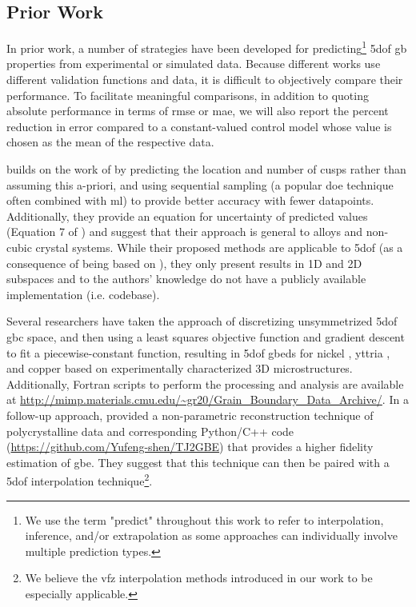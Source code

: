 \documentclass[final,twocolumn,12pt]{elsarticle}
\begin{document}
\subsection{Prior Work}
\label{sec:intro:prior}
 In prior work, a number of strategies have been developed for predicting\footnote{We use the term "predict" throughout this work to refer to interpolation, inference, and/or extrapolation as some approaches can individually involve multiple prediction types. } \gls{5dof} \gls{gb} properties from experimental or simulated data. Because different works use different validation functions and data, it is difficult to objectively compare their performance. To facilitate meaningful comparisons, in addition to quoting absolute performance in terms of \gls{rmse} or \gls{mae}, we will also report the percent reduction in error compared to a constant-valued control model whose value is chosen as the mean of the respective \inpt{} data.

\citet{detteEfficientSamplingMaterials2017} builds on the work of \citet{bulatovGrainBoundaryEnergy2014} by predicting the location and number of cusps rather than assuming this a-priori, and using sequential sampling (a popular \gls{doe} technique often combined with \gls{ml}) to provide better accuracy with fewer datapoints. Additionally, they provide an equation for uncertainty of predicted values (Equation 7 of \cite{detteEfficientSamplingMaterials2017}) and suggest that their approach is general to alloys and non-cubic crystal systems. While their proposed methods are applicable to \gls{5dof} (as a consequence of being based on \citet{bulatovGrainBoundaryEnergy2014}), they only present results in 1D and 2D subspaces and to the authors' knowledge do not have a publicly available implementation (i.e. codebase).

Several researchers have taken the approach of discretizing unsymmetrized \gls{5dof} \gls{gbc} space, and then using a least squares objective function and gradient descent to fit a piecewise-constant function, resulting in \gls{5dof} \glspl{gbed} for nickel \cite{liRelativeGrainBoundary2009}, yttria \cite{dillonCharacterizationGrainboundaryCharacter2009}, and copper \cite{randleFiveparameterGrainBoundary2008} based on experimentally characterized 3D microstructures. Additionally, Fortran scripts to perform the processing and analysis are available at \url{http://mimp.materials.cmu.edu/~gr20/Grain_Boundary_Data_Archive/}. In a follow-up approach, \citet{shenDeterminingGrainBoundary2019} provided a non-parametric reconstruction technique of polycrystalline data and corresponding Python/C++ code (\url{https://github.com/Yufeng-shen/TJ2GBE}) that provides a higher fidelity estimation of \gls{gbe}. They suggest that this technique can then be paired with a \gls{5dof} interpolation technique\footnote{We believe the \gls{vfz} interpolation methods introduced in our work to be especially applicable.}.
\end{document}
